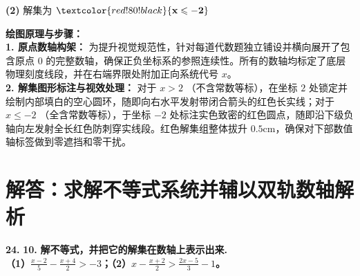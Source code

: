 \vspace{0.6cm}
\noindent \textbf{(2)} 解集为 $\textcolor{red!80!black}{\mathbf{x \leqslant -2}}$ \par\vspace{0.2cm}
\begin{center}
\end{center}

\vspace{0.4cm}
{\small\color{blue!70!black}
\textbf{绘图原理与步骤：}\\
\textbf{1. 原点数轴构架：} 为提升视觉规范性，针对每道代数题独立铺设并横向展开了包含原点 $0$ 的完整数轴，确保正负坐标系的参照连续性。所有的数轴均标定了底层物理刻度线段，并在右端界限处附加正向系统代号 $x$。\\
\textbf{2. 解集图形标注与视效处理：} 对于 $x > 2$ （不含常数等标），在坐标 $2$ 处锁定并绘制内部填白的空心圆环，随即向右水平发射带闭合箭头的红色长实线；对于 $x \leqslant -2$ （全含常数等标），于坐标 $-2$ 处标注实色致密的红色圆点，随即沿下级负轴向左发射全长红色防刺穿实线段。红色解集组整体拔升 $0.5\mathrm{cm}$，确保对下部数值轴标签做到零遮挡和零干扰。
}

\newpage



\newpage

\section{解答：求解不等式系统并辅以双轨数轴解析}

\vspace{0.6cm}

\textbf{\LARGE 24.} \textbf{\color{cyan!80!blue} 10. }\textbf{解不等式，并把它的解集在数轴上表示出来.\\
（1）$\frac{x-2}{5} - \frac{x+4}{2} > -3$；\hspace{2cm}（2）$x - \frac{x+2}{2} > \frac{2x-5}{3} - 1$。}

